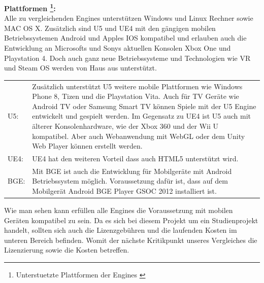 \textbf{Plattformen \footnote{Unterstuetzte Plattformen der Engines \cite{epicgames2015engine} \cite{unitytechnology2015platform} \cite{blender.org2015engine}}:}\\
Alle zu vergleichenden Engines unterstützen Windows und Linux Rechner sowie MAC OS X. Zusätzlich sind \ac{U5} und \ac{UE4} mit den gängigen mobilen Betriebssystemen Android und Apples IOS kompatibel und erlauben auch die Entwicklung an Microsofts und Sonys aktuellen Konsolen Xbox One und Playstation 4. Doch auch ganz neue Betriebssysteme und Technologien wie VR und Steam OS werden von Haus aus unterstützt.

\begin{table}[H]
\centering
\renewcommand{\arraystretch}{1.5}
\begin{tabular}{lp{14.5cm}}
\ac{U5}:  & Zusätzlich unterstützt \ac{U5} weitere mobile Plattformen wie Windows Phone 8, Tizen und die Playstation Vita. Auch für TV Geräte wie Android TV oder Samsung Smart TV können Spiele mit der \ac{U5} Engine entwickelt und gespielt werden. Im Gegensatz zu \ac{UE4} ist \ac{U5} auch mit älterer Konsolenhardware, wie der Xbox 360 und der Wii U kompatibel. Aber auch Webanwendung mit WebGL oder dem Unity Web Player können erstellt werden. \\

\ac{UE4}: & \ac{UE4} hat den weiteren Vorteil dass auch HTML5 unterstützt wird. \\

\ac{BGE}:     & Mit \ac{BGE} ist auch die Entwicklung für Mobilgeräte mit Android Betriebssystem möglich. Voraussetzung dafür ist, dass auf dem Mobilgerät Android \ac{BGE} Player GSOC 2012 installiert ist. 
\end{tabular}
\end{table}

Wie man sehen kann erfüllen alle Engines die Voraussetzung mit mobilen Geräten kompatibel zu sein. Da es sich bei diesem Projekt um ein Studienprojekt handelt, sollten sich auch die Lizenzgebühren und die laufenden Kosten im unteren Bereich befinden. Womit der nächste Kritikpunkt unseres Vergleiches die Lizenzierung sowie die Kosten betreffen.\\

